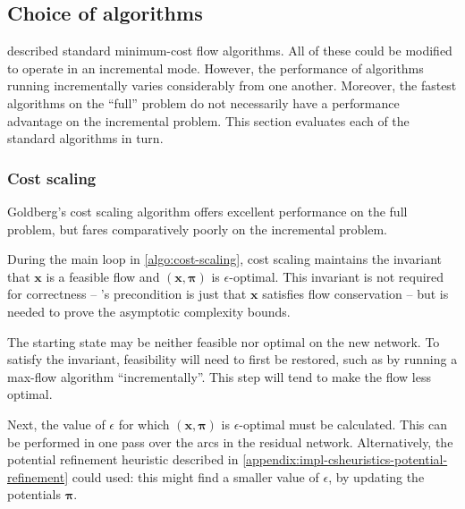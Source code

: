 \subsection{Choice of algorithms} \label{sec:impl-incremental-choice}
 described standard minimum-cost flow algorithms. All of these could be modified to operate in an incremental mode. However, the performance of algorithms running incrementally varies considerably from one another. Moreover, the fastest algorithms on the ``full'' problem do not necessarily have a performance advantage on the incremental problem. This section evaluates each of the standard algorithms in turn.

\subsubsection{Cost scaling} 
Goldberg's cost scaling algorithm offers excellent performance on the full problem, but fares comparatively poorly on the incremental problem. 

During the main loop in \cref{algo:cost-scaling}, cost scaling maintains the invariant that $\mathbf{x}$ is a feasible flow and $\left(\mathbf{x},\boldsymbol{\pi}\right)$ is $\epsilon$-optimal. This invariant is not required for correctness -- 's precondition is just that $\mathbf{x}$ satisfies flow conservation -- but is needed to prove the asymptotic complexity bounds.

The starting state may be neither feasible nor optimal on the new network. To satisfy the invariant, feasibility will need to first be restored, such as by running a max-flow algorithm ``incrementally''\footnotemark. This step will tend to make the flow less optimal.

Next, the value of $\epsilon$ for which $\left(\mathbf{x},\boldsymbol{\pi}\right)$ is $\epsilon$-optimal must be calculated. This can be performed in one pass over the arcs in the residual network\footnotemark. Alternatively, the potential refinement heuristic described in \cref{appendix:impl-csheuristics-potential-refinement} could used: this might find a smaller value of $\epsilon$, by updating the potentials $\boldsymbol{\pi}$.

